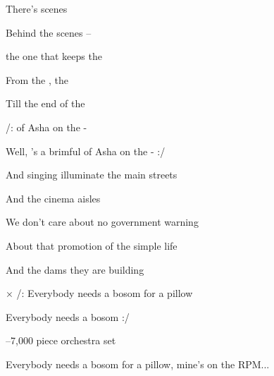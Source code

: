 
\zs
There's    scenes

Behind the  scenes --  

 the one that keeps the  

From the ,  the 

Till the end of the 
\ks

\zr
/:  of Asha on the -

Well, 's a brimful of Asha on the - :/
\kr

\zs
And singing illuminate the main streets

And the cinema aisles

We don't care about no government warning

About that promotion of the simple life

And the dams they are building
\ks

× /: Everybody needs a bosom for a pillow

Everybody needs a bosom :/
\ks

\zr \kr

\zr \kr

--7,000 piece orchestra set

Everybody needs a bosom for a pillow, mine's on the RPM...
\ks
\kp
